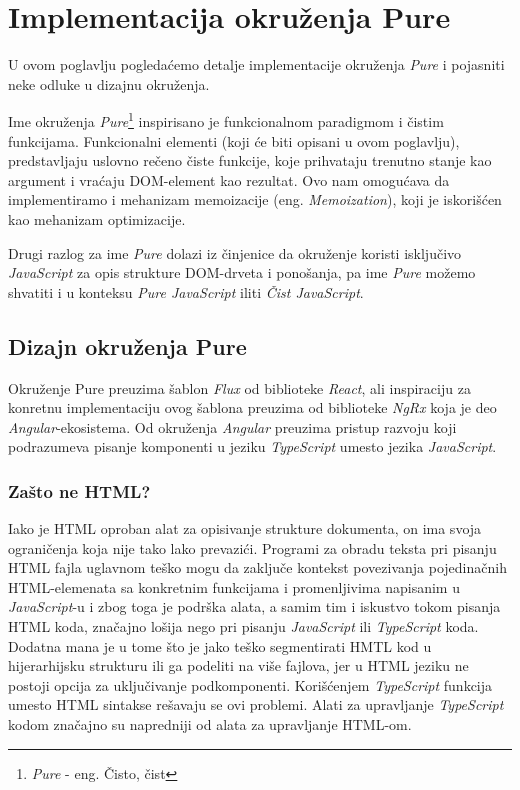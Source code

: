 \documentclass[12pt,oneside]{memoir}
\begin{document}
\chapter{Implementacija okruženja Pure}
U ovom poglavlju pogledaćemo detalje implementacije okruženja \emph{Pure} i pojasniti neke odluke u dizajnu okruženja.

Ime okruženja \emph{Pure}\footnote{\emph{Pure} - eng. Čisto, čist} inspirisano je 
funkcionalnom paradigmom i čistim funkcijama. Funkcionalni elementi (koji će biti opisani u ovom poglavlju),
predstavljaju uslovno rečeno čiste funkcije, koje prihvataju trenutno stanje kao argument i vraćaju
DOM-element kao rezultat. Ovo nam omogućava da implementiramo i mehanizam memoizacije (eng. \emph{Memoization}),
koji je iskorišćen kao mehanizam optimizacije.

Drugi razlog za ime \emph{Pure} dolazi iz činjenice da okruženje koristi isključivo \emph{JavaScript}
za opis strukture DOM-drveta i ponošanja, pa ime \emph{Pure} možemo shvatiti i u konteksu \emph{Pure JavaScript} iliti \emph{Čist JavaScript}.

\section{Dizajn okruženja Pure}
Okruženje Pure preuzima šablon \emph{Flux} od biblioteke \emph{React}, ali inspiraciju za konretnu implementaciju ovog šablona
preuzima od biblioteke \emph{NgRx} koja je deo \emph{Angular}-ekosistema. Od okruženja \emph{Angular}
preuzima pristup razvoju koji podrazumeva pisanje komponenti u jeziku \emph{TypeScript} umesto jezika \emph{JavaScript}.
\subsection{Zašto ne HTML?}
Iako je HTML oproban alat za opisivanje strukture dokumenta, on ima svoja ograničenja koja nije tako lako prevazići.
Programi za obradu teksta pri pisanju HTML fajla uglavnom teško mogu da zaključe kontekst povezivanja
pojedinačnih HTML-elemenata sa konkretnim funkcijama i promenljivima napisanim u \emph{JavaScript}-u i zbog toga je podrška alata,
a samim tim i iskustvo tokom pisanja HTML koda, značajno lošija nego pri pisanju \emph{JavaScript} ili \emph{TypeScript} koda.
Dodatna mana je u tome što je jako teško segmentirati HMTL kod u hijerarhijsku strukturu ili ga podeliti na više fajlova,
jer u HTML jeziku ne postoji opcija za uključivanje podkomponenti.
Korišćenjem \emph{TypeScript} funkcija umesto HTML sintakse rešavaju se ovi problemi.
Alati za upravljanje \emph{TypeScript} kodom značajno su napredniji od alata za upravljanje HTML-om.
\end{document}
